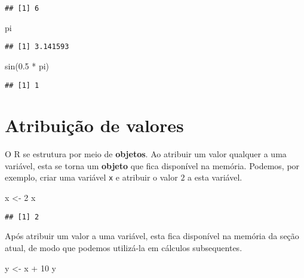 \documentclass[
]{book}
\newenvironment{Shaded}{\begin{snugshade}}{\end{snugshade}}
\newcommand{\DecValTok}[1]{\textcolor[rgb]{0.00,0.00,0.81}{#1}}
\newcommand{\FloatTok}[1]{\textcolor[rgb]{0.00,0.00,0.81}{#1}}
\newcommand{\FunctionTok}[1]{\textcolor[rgb]{0.00,0.00,0.00}{#1}}
\newcommand{\NormalTok}[1]{#1}
\newcommand{\OtherTok}[1]{\textcolor[rgb]{0.56,0.35,0.01}{#1}}
\newcommand{\SpecialCharTok}[1]{\textcolor[rgb]{0.00,0.00,0.00}{#1}}
\begin{document}
\begin{verbatim}
## [1] 6
\end{verbatim}

\begin{Shaded}
\begin{Highlighting}[]
\NormalTok{pi}
\end{Highlighting}
\end{Shaded}

\begin{verbatim}
## [1] 3.141593
\end{verbatim}

\begin{Shaded}
\begin{Highlighting}[]
\FunctionTok{sin}\NormalTok{(}\FloatTok{0.5} \SpecialCharTok{*}\NormalTok{ pi)}
\end{Highlighting}
\end{Shaded}

\begin{verbatim}
## [1] 1
\end{verbatim}

\hypertarget{atribuiuxe7uxe3o-de-valores}{%
\section{Atribuição de valores}\label{atribuiuxe7uxe3o-de-valores}}

O R se estrutura por meio de \textbf{objetos}. Ao atribuir um valor qualquer a uma variável, esta se torna um \textbf{objeto} que fica disponível na memória. Podemos, por exemplo, criar uma variável \texttt{x} e atribuir o valor \(2\) a esta variável.

\begin{Shaded}
\begin{Highlighting}[]
\NormalTok{x }\OtherTok{\textless{}{-}} \DecValTok{2}
\NormalTok{x}
\end{Highlighting}
\end{Shaded}

\begin{verbatim}
## [1] 2
\end{verbatim}

Após atribuir um valor a uma variável, esta fica disponível na memória da seção atual, de modo que podemos utilizá-la em cálculos subsequentes.

\begin{Shaded}
\begin{Highlighting}[]
\NormalTok{y }\OtherTok{\textless{}{-}}\NormalTok{ x }\SpecialCharTok{+} \DecValTok{10}
\NormalTok{y}
\end{Highlighting}
\end{Shaded}
\end{document}
